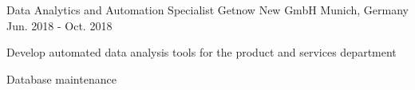 \begin{cventries}

\cventry
{Data Analytics and Automation Specialist} %
{Getnow New GmbH} %
{Munich, Germany} %
{Jun. 2018 - Oct. 2018} %
{ %
\begin{cvitems}
\item {Develop automated data analysis tools for the product and services department}
\item {Database maintenance}
\end{cvitems}
}

\end{cventries}
